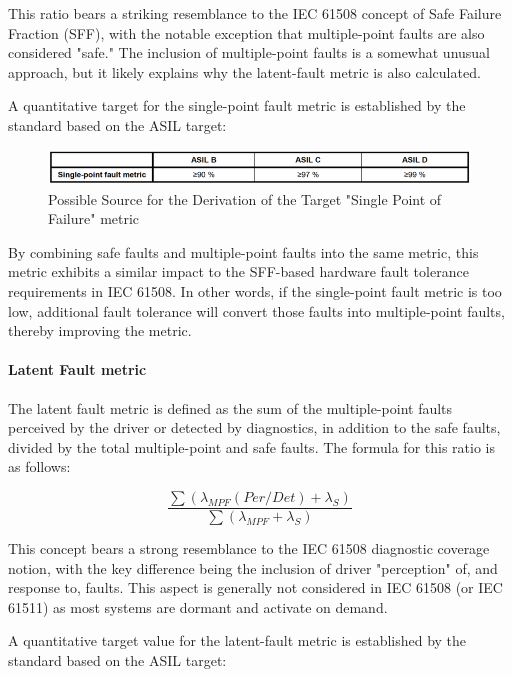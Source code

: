 \documentclass[./dissertation.tex]{subfiles}
\begin{document}
This ratio bears a striking resemblance to the IEC 61508 concept of Safe Failure Fraction (SFF), with the notable exception that multiple-point faults are also considered "safe." The inclusion of multiple-point faults is a somewhat unusual approach, but it likely explains why the latent-fault metric is also calculated.

A quantitative target for the single-point fault metric is established by the standard based on the ASIL target:

\begin{figure}[H]
\centering
\includegraphics[width=\linewidth]{subfiles/imgs/asil-t-4.png}
\caption{Possible Source for the Derivation of the Target "Single Point of Failure" metric}
\label{fig:asil-t-4}
\end{figure}

By combining safe faults and multiple-point faults into the same metric, this metric exhibits a similar impact to the SFF-based hardware fault tolerance requirements in IEC 61508. In other words, if the single-point fault metric is too low, additional fault tolerance will convert those faults into multiple-point faults, thereby improving the metric.

\paragraph{Latent Fault metric}
The latent fault metric is defined as the sum of the multiple-point faults perceived by the driver or detected by diagnostics, in addition to the safe faults, divided by the total multiple-point and safe faults. The formula for this ratio is as follows:

\begin{equation}
\frac{\sum(\lambda_{MPF}(Per/Det) + \lambda_{S})}{\sum(\lambda_{MPF} + \lambda_{S})}
\end{equation}

This concept bears a strong resemblance to the IEC 61508 diagnostic coverage notion, with the key difference being the inclusion of driver "perception" of, and response to, faults. This aspect is generally not considered in IEC 61508 (or IEC 61511) as most systems are dormant and activate on demand.

A quantitative target value for the latent-fault metric is established by the standard based on the ASIL target:
\end{document}
